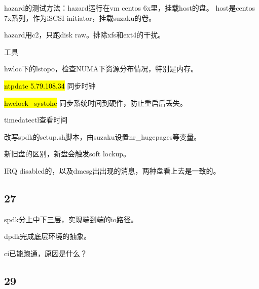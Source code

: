 hazard的测试方法：hazard运行在vm centos 6x里，挂载host的盘。
host是centos 7x系列，作为iSCSI initiator，挂载suzaku的卷。

hazard用c2，只跑disk raw。排除xfs和ext4的干扰。

\hrulefill

工具

hwloc下的lstopo，检查NUMA下资源分布情况，特别是内存。

\hl{ntpdate 5.79.108.34} 同步时钟

\hl{hwclock --systohc} 同步系统时间到硬件，防止重启后丢失。

timedatectl查看时间

改写spdk的setup.sh脚本，由suzaku设置nr\_hugepages等变量。

新旧盘的区别，新盘会触发soft lockup。

IRQ disabled的，以及dmesg出出现的消息，两种盘看上去是一致的。

\subsection{27}

spdk分上中下三层，实现端到端的io路径。

dpdk完成底层环境的抽象。

ci已能跑通，原因是什么？

\subsection{29}


